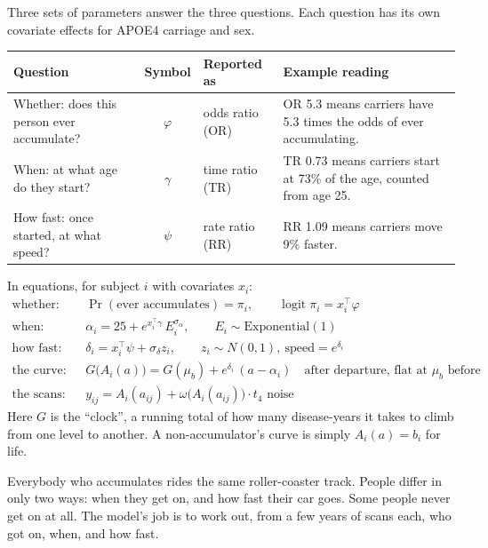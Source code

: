 \documentclass[11pt]{article}
\begin{document}
Three sets of parameters answer the three questions. Each question has its own covariate effects for APOE4 carriage and sex.

\begin{center}
\begin{tabularx}{\textwidth}{@{}l c l X@{}}
\toprule
Question & Symbol & Reported as & Example reading \\
\midrule
Whether: does this person ever accumulate? & $\varphi$ & odds ratio (OR) & OR 5.3 means carriers have 5.3 times the odds of ever accumulating. \\
When: at what age do they start? & $\gamma$ & time ratio (TR) & TR 0.73 means carriers start at 73\% of the age, counted from age 25. \\
How fast: once started, at what speed? & $\psi$ & rate ratio (RR) & RR 1.09 means carriers move 9\% faster. \\
\bottomrule
\end{tabularx}
\end{center}

In equations, for subject $i$ with covariates $x_i$:
\begin{align*}
\text{whether:}\quad & \Pr(\text{ever accumulates}) = \pi_i, \qquad \operatorname{logit}\pi_i = x_i^\top\varphi\\
\text{when:}\quad & \alpha_i = 25 + e^{x_i^\top\gamma}\,E_i^{\sigma_\alpha}, \qquad E_i \sim \text{Exponential}(1)\\
\text{how fast:}\quad & \delta_i = x_i^\top\psi + \sigma_\delta z_i, \qquad z_i \sim N(0,1),\ \text{speed} = e^{\delta_i}\\
\text{the curve:}\quad & G\big(A_i(a)\big) = G(\mu_b) + e^{\delta_i}\,(a - \alpha_i) \quad\text{after departure, flat at } \mu_b \text{ before}\\
\text{the scans:}\quad & y_{ij} = A_i(a_{ij}) + \omega\big(A_i(a_{ij})\big)\cdot t_4 \text{ noise}
\end{align*}
Here $G$ is the ``clock'', a running total of how many disease-years it takes to climb from one level to another. A non-accumulator's curve is simply $A_i(a) = b_i$ for life.

\begin{plain}
Everybody who accumulates rides the same roller-coaster track. People differ in only two ways: when they get on, and how fast their car goes. Some people never get on at all. The model's job is to work out, from a few years of scans each, who got on, when, and how fast.
\end{plain}
\end{document}
